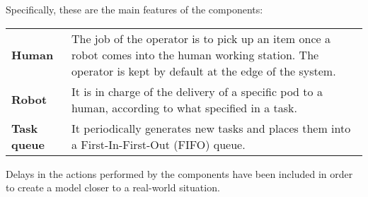 \noindent Specifically, these are the main features of the components:
\vspace{0,5cm}

\begin{tabularx}{\textwidth}{lX}
\textbf{Human} & The job of the operator is to pick up an item once a robot comes into the human working station. The operator is kept by default at the edge of the system.\vspace{0,2cm}\\
\textbf{Robot} & It is in charge of the delivery of a specific pod to a human, according to what specified in a task.\vspace{0,2cm}\\
\textbf{Task queue} & It periodically generates new tasks and places them into a First-In-First-Out (FIFO) queue.\vspace{0,2cm}\\
\end{tabularx}

Delays in the actions performed by the components have been included in order to create a model closer to a real-world situation.